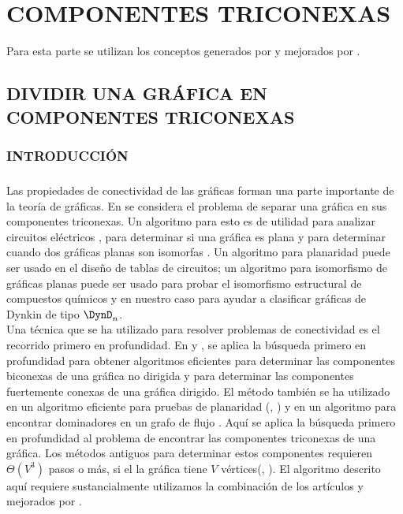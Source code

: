 \chapter{COMPONENTES TRICONEXAS}

Para esta parte se utilizan los conceptos generados por \citep{hopcroft1973} y mejorados por \citep{Gutwenger2000ALT}.

\section{DIVIDIR UNA GRÁFICA EN COMPONENTES TRICONEXAS}

\subsection{INTRODUCCIÓN}

\paragraph{}
Las propiedades de conectividad de las gráficas forman una parte importante de la teoría de gráficas. En \citep{hopcroft1973} se considera el problema de separar una gráfica en sus componentes triconexas. Un algoritmo para esto es de utilidad para analizar circuitos eléctricos \citep{1083313} , para determinar si una gráfica es plana \citep{10893101} y para determinar cuando dos gráficas planas son isomorfas \citep{Hopcroft1972}. Un algoritmo para planaridad puede ser usado en el diseño de tablas de circuitos; un algoritmo para isomorfismo de gráficas planas puede ser usado para probar el isomorfismo estructural de compuestos químicos \citep{Lederberg1964DENDRAL64AS} y en nuestro caso para ayudar a clasificar gráficas de Dynkin de tipo $\DynD_{n}$.\\

Una técnica que se ha utilizado para resolver problemas de conectividad es el recorrido primero en profundidad. En \citep{4569669} y \citep{efalgm}, se aplica la búsqueda primero en profundidad para obtener algoritmos eficientes para determinar las componentes biconexas de una gráfica no dirigida y para determinar las componentes fuertemente conexas de una gráfica dirigido. El método también se ha utilizado en un algoritmo eficiente para pruebas de planaridad (\citep{tarjan1971efficient}, \citep{ept}) y en un algoritmo para encontrar dominadores en un grafo de flujo \citep{Tarjan1974FindingDI}. Aquí se aplica la búsqueda primero en profundidad al problema de encontrar las componentes triconexas de una gráfica. Los métodos antiguos para determinar estos componentes requieren $\Theta\left(V^{3}\right)$ pasos o más, si el la gráfica tiene $V$ vértices(\citep{1083313}, \cite{1082941}). El algoritmo descrito aquí requiere sustancialmente utilizamos la combinación de los artículos \citep{hopcroft1973} y mejorados por \citep{Gutwenger2000ALT}.\\

